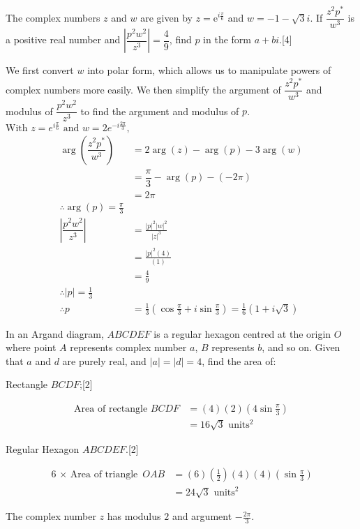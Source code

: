 \documentclass[12pt, a4 paper]{article}
\begin{document}
\begin{outline}[enumerate]
	\1 The complex numbers $z$ and $w$ are given by $z=\mathrm{e}^{i\frac{\pi}{6}}$ and $w=-1-\sqrt{3}i$. If $\dfrac{z^2p^*}{w^3}$ is a positive real number and $\left|\dfrac{p^2w^2}{z^3}\right|=\dfrac{4}{9}$, find $p$ in the form $a+bi$.\hfill[4] %
	\begin{answer}
		We first convert $w$ into polar form, which allows us to manipulate powers of complex numbers more easily. We then simplify the argument of $\dfrac{z^2p^*}{w^3}$ and modulus of $\dfrac{p^2w^2}{z^3}$ to find the argument and modulus of $p$.\\$\textrm{With }z=e^{i\frac{\pi}{6}} \textrm{ and } w=2e^{-i\frac{2\pi}{3}},$
		\begin{align*}
			\arg{(\dfrac{z^2p^*}{w^3})}      & =2\arg{(z)}-\arg{(p)}-3\arg{(w)}
			\\
			                                 & = \dfrac{\pi}{3}-\arg{(p)}-(-2\pi)                                              \\&=2\pi\\
			\therefore \arg{(p)} = \frac{\pi}{3}\\
			\left|\dfrac{p^2w^2}{z^3}\right| & = \frac{|p|^2|w|^2}{|z|^3}                                                      \\
			                                 & = \frac{|p|^2(4)}{(1)}                                                          \\
			                                 & = \frac{4}{9}                                                                   \\
			\therefore |p|=\frac{1}{3}\\
			\therefore p                     & =\frac{1}{3}(\cos{\frac{\pi}{3}}+i\sin{\frac{\pi}{3}})=\frac{1}{6}(1+i\sqrt{3})
		\end{align*}
	\end{answer}


	\1 In an Argand diagram, $ABCDEF$ is a regular hexagon centred at the origin $O$ where point $A$ represents complex number $a$, $B$ represents $b$, and so on. Given that $a$ and $d$ are purely real, and $|a|=|d|=4$, find the area of: %

	\2 Rectangle $BCDF$;\hfill[2]
	\begin{answer}
		\begin{align*}
			\textrm{Area of rectangle }BCDF & = (4)(2)(4\sin{\frac{\pi}{3}})  \\
			                                & = 16\sqrt{3}\textrm{ units$^2$}
		\end{align*}
	\end{answer}
	\2 Regular Hexagon $ABCDEF$.\hfill[2]
	\begin{answer}
		\begin{align*}
			\textrm{6 $\times$ Area of triangle }OAB & = (6)(\frac{1}{2})(4)(4)(\sin{\frac{\pi}{3}}) \\
			                                         & = 24\sqrt{3}\textrm{ units$^2$}
		\end{align*}
	\end{answer}
	\1 The complex number $z$ has modulus $2$ and argument $-\frac{2\pi}{3}$. %


\end{outline}
\end{document}
